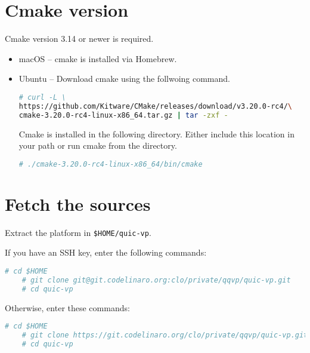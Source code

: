 \section{Cmake version}

Cmake version 3.14 or newer is required.

\begin{itemize}
\item macOS -- cmake is installed via Homebrew.
\item Ubuntu -- Download cmake using the follwoing command.

\small
\begin{lstlisting}[language=bash]
    # curl -L \
https://github.com/Kitware/CMake/releases/download/v3.20.0-rc4/\
cmake-3.20.0-rc4-linux-x86_64.tar.gz | tar -zxf -
\end{lstlisting}
\normalsize

Cmake is installed in the following directory. Either include this location in your path or run cmake from the directory.

\small
\begin{lstlisting}[language=bash]
    # ./cmake-3.20.0-rc4-linux-x86_64/bin/cmake
\end{lstlisting}
\normalsize

\end{itemize}

\section{Fetch the sources}

Extract the platform in {\small{\lstinline!$HOME/quic-vp!}}.

If you have an SSH key, enter the following commands:

\small
\begin{lstlisting}[language=bash]
    # cd $HOME
    # git clone git@git.codelinaro.org:clo/private/qqvp/quic-vp.git
    # cd quic-vp
\end{lstlisting}
\normalsize

Otherwise, enter these commands:

\small
\begin{lstlisting}[language=bash]
    # cd $HOME
    # git clone https://git.codelinaro.org/clo/private/qqvp/quic-vp.git
    # cd quic-vp
\end{lstlisting}
\normalsize

